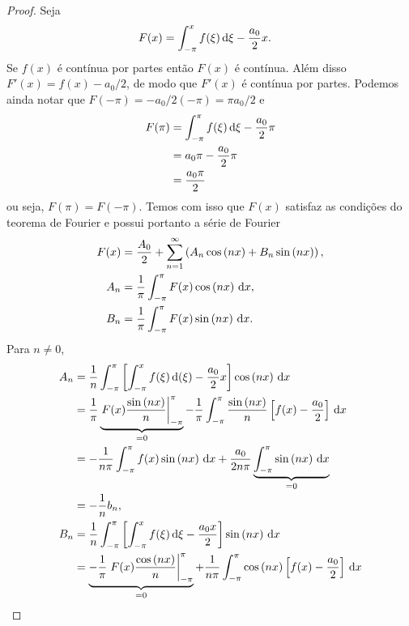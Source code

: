 \begin{proof}
    Seja
    \begin{align*}
        F(x) &= \int_{-\pi}^x f(\xi) \, \mathrm{d}\xi - \frac{a_0}{2} x.
    \end{align*}
    Se $f(x)$ \'{e} cont\'{i}nua por partes ent\~{a}o $F(x)$ \'{e} cont\'{i}nua. Al\'{e}m disso $F'(x) = f(x) - a_0/2$, de modo que $F'(x)$ \'{e} cont\'{i}nua por partes. Podemos ainda notar que $F(-\pi) = -a_0 / 2 (-\pi) = \pi a_0 / 2$ e
    \begin{align*}
        F(\pi) &= \int_{-\pi}^\pi f(\xi) \, \mathrm{d}\xi - \frac{a_0}{2} \pi \\
        &= a_0 \pi - \frac{a_0}{2} \pi \\
        &= \frac{a_0 \pi}{2}
    \end{align*} 
    ou seja, $F(\pi) = F(-\pi)$. Temos com isso que $F(x)$ satisfaz as condi\c{c}\~{o}es do teorema de Fourier e possui portanto a s\'{e}rie de Fourier
    \begin{align*}
        F(x) &= \frac{A_0}{2} + \sum_{n = 1}^\infty \left( A_n \cos\left( n x \right) + B_n \sin\left( n x \right) \right), \\
        A_n &= \frac{1}{\pi} \int_{-\pi}^\pi F(x) \cos\left( n x \right) \, \mathrm{d}x, \\
        B_n &= \frac{1}{\pi} \int_{-\pi}^\pi F(x) \sin\left( n x \right) \, \mathrm{d}x.
    \end{align*}
    Para $n \neq 0$,
    \begin{align*}
        A_n &= \frac{1}{n} \int_{-\pi}^\pi \left[ \int_{-\pi}^x f(\xi) \id(\xi) - \frac{a_0}{2} x \right] \cos\left( n x \right) \id{x} \\
        &= \frac{1}{\pi} \underbrace{\left. F(x) \frac{\sin\left( n x \right)}{n} \right|_{-\pi}^\pi}_{=0} - \frac{1}{\pi} \int_{-\pi}^\pi \frac{\sin\left( n x \right)}{n} \left[ f(x) - \frac{a_0}{2} \right] \id{x} \\
        &= - \frac{1}{n \pi} \int_{-\pi}^\pi f(x) \sin\left( n x \right) \id{x} + \frac{a_0}{2 n \pi} \underbrace{\int_{-\pi}^\pi \sin\left( n x \right) \id{x}}_{=0} \\
        &= -\frac{1}{n} b_n, \\
        B_n &= \frac{1}{n} \int_{-\pi}^\pi \left[ \int_{-\pi}^x f(\xi) \id{\xi} - \frac{a_0 x}{2} \right] \sin\left( n x \right) \id{x} \\
        &= \underbrace{-\frac{1}{\pi} \left. F(x) \frac{\cos\left( n x \right)}{n} \right|_{-\pi}^\pi}_{=0} + \frac{1}{n \pi} \int_{-\pi}^\pi \cos\left( n x \right) \left[ f(x) - \frac{a_0}{2} \right] \id{x} \\

\end{align*}
\end{proof}
